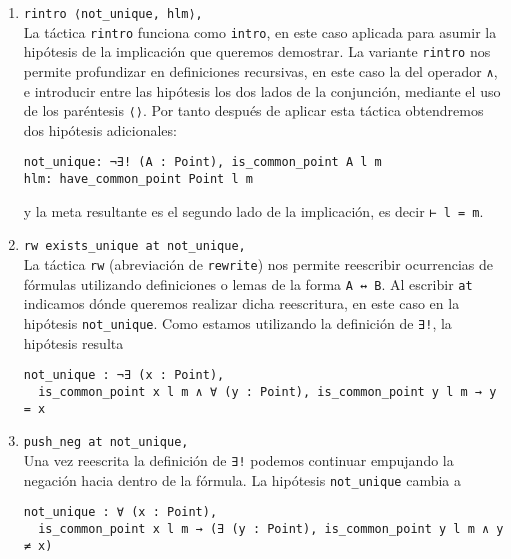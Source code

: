 \begin{enumerate}[label=L.\arabic*, topsep=0mm]
	      Es interesante notar que \lstinline{push_neg} no consigue
	      \guillemotleft empujar\guillemotright la negación todo lo que
	      podríamos desear.

	      Esto es así porque no está reescribiendo las definiciones previas y de
	      \lstinline{∃!}. Esto lo tendremos que hacer manualmente, como se verá
	      enseguida.

	\item \lstinline{rintro ⟨not_unique, hlm⟩,}\\[.5em] La táctica \lstinline{rintro}
	      funciona como \lstinline{intro}, en este caso aplicada para asumir la
	      hipótesis de la implicación que queremos demostrar. La variante
	      \lstinline{rintro} nos permite profundizar en definiciones recursivas, en este
	      caso la del operador \lstinline{∧}, e introducir entre las hipótesis
	      los dos lados de la conjunción, mediante el uso de los paréntesis
	      \lstinline{⟨⟩}. Por tanto después de aplicar esta táctica obtendremos dos
	      hipótesis adicionales:
	      \begin{lstlisting}
not_unique: ¬∃! (A : Point), is_common_point A l m
hlm: have_common_point Point l m
\end{lstlisting}
	      y la meta resultante es el segundo lado de la implicación, es decir
	      \lstinline{⊢ l = m}.

	\item \lstinline{rw exists_unique at not_unique,}\\[.5em] La táctica \lstinline{rw}
	      (abreviación de \lstinline{rewrite}) nos permite reescribir ocurrencias de
	      fórmulas utilizando definiciones o lemas de la forma \lstinline{A ↔ B}. Al
	      escribir \lstinline{at} indicamos dónde queremos realizar dicha
	      reescritura, en este caso en la hipótesis \lstinline{not_unique}.
	      Como estamos utilizando la definición de \lstinline{∃!}, la hipótesis
	      resulta
	      \begin{lstlisting}
not_unique : ¬∃ (x : Point), 
  is_common_point x l m ∧ ∀ (y : Point), is_common_point y l m → y = x
\end{lstlisting}

	\item \lstinline{push_neg at not_unique,}\\[.5em] Una vez reescrita la
	      definición de \lstinline{∃!} podemos continuar empujando la negación
	      hacia dentro de la fórmula.
	      La hipótesis \lstinline{not_unique} cambia a
	      \begin{lstlisting}
not_unique : ∀ (x : Point), 
  is_common_point x l m → (∃ (y : Point), is_common_point y l m ∧ y ≠ x)
\end{lstlisting}


\end{enumerate}
